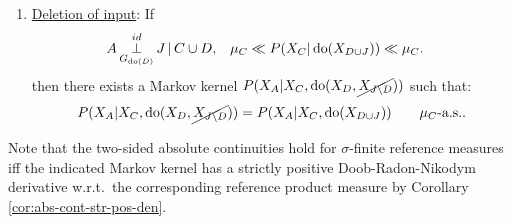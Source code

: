 \begin{Cor}
\begin{enumerate}
         \begin{align*} 
             A &\idPerp_{G_{\doit(I_B\cup D)}} I_B \given C  \cup D, &          
             \mu_C &\ll P(X_C|\doit(X_B,X_{D})) \ll \mu_C, \\
                   && \mu_C &\ll P(X_C|\doit(X_{D})) \ll \mu_C.
         \end{align*}
       \item \underline{Deletion of input}:
         If 
         \begin{align*} 
           A &\operatorname*{\perp}^{id}_{G_{\operatorname{do}(D)}} J \operatorname*{|} C \cup D, &          
             \mu_C &\ll P(X_C|\operatorname{do}(X_{D\cup J})) \ll \mu_C.
         \end{align*}
         then there exists a Markov kernel $P(X_A|X_C,\operatorname{do}(X_{D},\cancel{X_{J\setminus D}}))$ such that:
         \[ P(X_A|X_C,\operatorname{do}(X_{D},\cancel{X_{J\setminus D}})) = P(X_A|X_C,\operatorname{do}(X_{D \cup J})) \qquad \mu_C\text{-a.s.}. \]
    \end{enumerate}
    Note that the two-sided absolute continuities hold for $\sigma$-finite reference measures iff the indicated Markov kernel has a strictly positive Doob-Radon-Nikodym derivative w.r.t.\ the corresponding reference product measure by Corollary \ref{cor:abs-cont-str-pos-den}.
\end{Cor}
